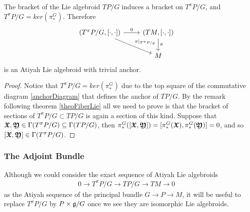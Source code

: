 \begin{theorem}\label{theoremVerticalAtiyahIsAlgebroid}
The bracket of the Lie algebroid $TP/G$ induces a bracket on $T^\pi P/G$, and $T^\pi P/G = ker(\pi_*^G)$. Therefore
\begin{equation*}
    \begin{tikzcd}
    (T^\pi P/G, [\cdot, \cdot]) \arrow{r}{0} \arrow{dr}{\pi|_{T^\pi P/g}} & (TM, [\cdot, \cdot]) \arrow{d}{\pi}\\
    & M
    \end{tikzcd}
\end{equation*}
is an Atiyah Lie algebroid with trivial anchor.
\end{theorem}

\begin{proof}
Notice that $T^\pi P/G = ker(\pi_*^G)$ due to the top square of the commutative diagram \eqref{anchorDiagram} that defines the anchor of $TP/G$. By the remark following theorem \ref{theoFiberLie} all we need to prove is that the bracket of sections of $T^\pi P/G \subset TP/G$ is again a section of this kind. Suppose that $\bm{\mathfrak{X}}, \bm{\mathfrak{Y}} \in \Gamma(T^\pi P/G) \subseteq \Gamma(TP/G)$, then $\pi_*^G([\bm{\mathfrak{X}}, \bm{\mathfrak{Y}}]) = [\pi_*^G (\bm{\mathfrak{X}}), \pi_*^G(\bm{\mathfrak{Y}})] \\= 0$, and so $[\bm{\mathfrak{X}}, \bm{\mathfrak{Y}}] \in \Gamma(T^\pi P/G)$. 
\end{proof}

\subsubsection{The Adjoint Bundle}

Although we could consider the exact sequence of Atiyah Lie algebroids
\begin{align*}
    0 \to T^\pi P/G \to TP/G \to TM \to 0
\end{align*}
as the Atiyah sequence of the principal bundle $G \to P \to M$, it will be useful to replace $T^\pi P/G$ by $P \times \mathfrak{g}/G$ once we see they are isomorphic Lie algebroids.


